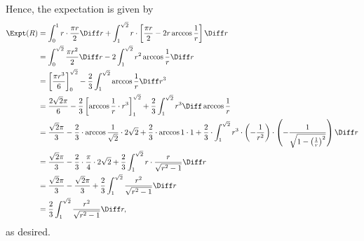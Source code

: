 \begin{enumerate}
          Hence, the expectation is given by
          \begin{align*}
              \Expt(R) & = \int_{0}^{1} r \cdot \frac{\pi r}{2} \Diff r + \int_{1}^{\sqrt{2}} r \cdot \left[\frac{\pi r}{2} - 2r \arccos \frac{1}{r}\right] \Diff r                                                                                                                                                \\
                       & = \int_{0}^{\sqrt{2}} \frac{\pi r^2}{2} \Diff r - 2 \int_{1}^{\sqrt{2}} r^2 \arccos \frac{1}{r} \Diff r                                                                                                                                                                                   \\
                       & = \left[\frac{\pi r^3}{6}\right]_{0}^{\sqrt{2}} - \frac{2}{3} \int_{1}^{\sqrt{2}} \arccos \frac{1}{r} \Diff r^3                                                                                                                                                                           \\
                       & = \frac{2 \sqrt{2} \pi}{6} - \frac{2}{3} \left[\arccos \frac{1}{r} \cdot r^3\right]_{1}^{\sqrt{2}} + \frac{2}{3} \int_{1}^{\sqrt{2}} r^3 \Diff \arccos \frac{1}{r}                                                                                                                        \\
                       & = \frac{\sqrt{2} \pi}{3} - \frac{2}{3} \cdot \arccos \frac{1}{\sqrt{2}} \cdot 2 \sqrt{2} + \frac{2}{3} \cdot \arccos 1 \cdot 1+ \frac{2}{3} \cdot \int_{1}^{\sqrt{2}} r^3 \cdot \left(- \frac{1}{r^2}\right) \cdot \left(- \frac{1}{\sqrt{1 - \left(\frac{1}{r}\right)^2}}\right) \Diff r \\
                       & = \frac{\sqrt{2} \pi}{3} - \frac{2}{3} \cdot \frac{\pi}{4} \cdot 2\sqrt{2} + \frac{2}{3} \int_{1}^{\sqrt{2}} r \cdot \frac{r}{\sqrt{r^2 - 1}} \Diff r                                                                                                                                     \\
                       & = \frac{\sqrt{2} \pi}{3} - \frac{\sqrt{2} \pi}{3} + \frac{2}{3} \int_{1}^{\sqrt{2}} \frac{r^2}{\sqrt{r^2 - 1}} \Diff r                                                                                                                                                                    \\
                       & = \frac{2}{3} \int_{1}^{\sqrt{2}} \frac{r^2}{\sqrt{r^2 - 1}} \Diff r,
          \end{align*}
          as desired.


\end{enumerate}
